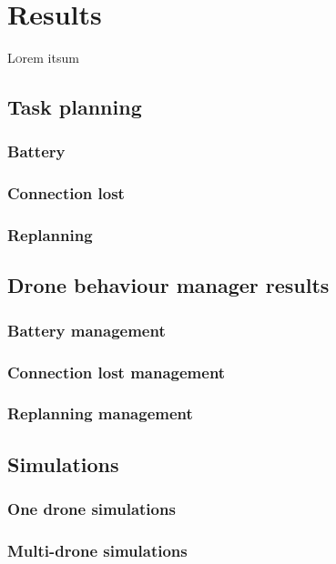 \chapter{Results}
\label{ch:Results}

\lettrine[lraise=-0.1, lines=2, loversize=0.2]{L}{o}rem itsum

\section{Task planning}
\label{sec:TaskPlanning}

\subsection{Battery}
\label{subsec:Battery}

\subsection{Connection lost}
\label{subsec:ConnectionLost}

\subsection{Replanning}
\label{subsec:Replanning}


\section{Drone behaviour manager results}
\label{sec:DroneBehavioutManagerResults}

\subsection{Battery management}
\label{subsec:BatteryManagement}

\subsection{Connection lost management}
\label{subsec:ConnectionLostManagement}

\subsection{Replanning management}
\label{subsec:ReplanningManagement}


\section{Simulations}
\label{sec:Simulations}

\subsection{One drone simulations}
\label{subsec:OneDroneSimulations}

\subsection{Multi-drone simulations}
\label{subsec:Multi-droneSimulations}

